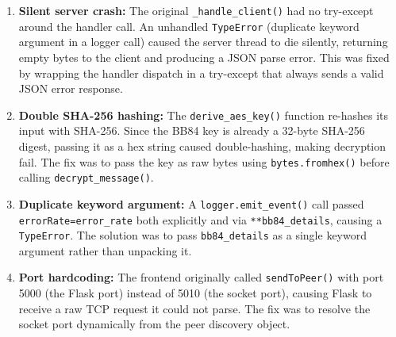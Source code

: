 \begin{enumerate}
    \item \textbf{Silent server crash:} The original \texttt{\_handle\_client()} had no try-except around the handler call. An unhandled \texttt{TypeError} (duplicate keyword argument in a logger call) caused the server thread to die silently, returning empty bytes to the client and producing a JSON parse error. This was fixed by wrapping the handler dispatch in a try-except that always sends a valid JSON error response.

    \item \textbf{Double SHA-256 hashing:} The \texttt{derive\_aes\_key()} function re-hashes its input with SHA-256. Since the BB84 key is already a 32-byte SHA-256 digest, passing it as a hex string caused double-hashing, making decryption fail. The fix was to pass the key as raw bytes using \texttt{bytes.fromhex()} before calling \texttt{decrypt\_message()}.

    \item \textbf{Duplicate keyword argument:} A \texttt{logger.emit\_event()} call passed \texttt{errorRate=error\_rate} both explicitly and via \texttt{**bb84\_details}, causing a \texttt{TypeError}. The solution was to pass \texttt{bb84\_details} as a single keyword argument rather than unpacking it.

    \item \textbf{Port hardcoding:} The frontend originally called \texttt{sendToPeer()} with port 5000 (the Flask port) instead of 5010 (the socket port), causing Flask to receive a raw TCP request it could not parse. The fix was to resolve the socket port dynamically from the peer discovery object.
\end{enumerate}
